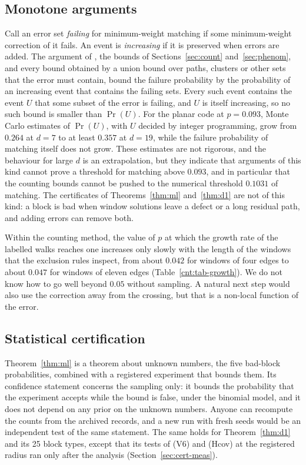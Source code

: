 \documentclass[11pt]{amsart}
\theoremstyle{definition}
\theoremstyle{remark}
\numberwithin{equation}{section}
\begin{document}
\subsection{Monotone arguments}\label{sec:disc-mono}
Call an error set \emph{failing} for minimum-weight matching if some minimum-weight correction of it fails. An event is \emph{increasing} if it is preserved when errors are added. The argument of \cite{DKLP02}, the bounds of Sections~\ref{sec:count} and~\ref{sec:phenom}, and every bound obtained by a union bound over paths, clusters or other sets that the error must contain, bound the failure probability by the probability of an increasing event that contains the failing sets. Every such event contains the event $U$ that some subset of the error is failing, and $U$ is itself increasing, so no such bound is smaller than $\Pr(U)$. For the planar code at $p=0.093$, Monte Carlo estimates of $\Pr(U)$, with $U$ decided by integer programming, grow from $0.264$ at $d=7$ to at least $0.357$ at $d=19$, while the failure probability of matching itself does not grow. These estimates are not rigorous, and the behaviour for large $d$ is an extrapolation, but they indicate that arguments of this kind cannot prove a threshold for matching above $0.093$, and in particular that the counting bounds cannot be pushed to the numerical threshold $0.1031$ of matching. The certificates of Theorems~\ref{thm:ml} and~\ref{thm:d1} are not of this kind: a block is bad when window solutions leave a defect or a long residual path, and adding errors can remove both.

Within the counting method, the value of $p$ at which the growth rate of the labelled walks reaches one increases only slowly with the length of the windows that the exclusion rules inspect, from about $0.042$ for windows of four edges to about $0.047$ for windows of eleven edges (Table~\ref{cnt:tab-growth}). We do not know how to go well beyond $0.05$ without sampling. A natural next step would also use the correction away from the crossing, but that is a non-local function of the error.

\subsection{Statistical certification}\label{sec:disc-stat}
Theorem~\ref{thm:ml} is a theorem about unknown numbers, the five bad-block probabilities, combined with a registered experiment that bounds them. Its confidence statement concerns the sampling only: it bounds the probability that the experiment accepts while the bound is false, under the binomial model, and it does not depend on any prior on the unknown numbers. Anyone can recompute the counts from the archived records, and a new run with fresh seeds would be an independent test of the same statement. The same holds for Theorem~\ref{thm:d1} and its 25 block types, except that its tests of (V6) and (Hcov) at the registered radius ran only after the analysis (Section~\ref{sec:cert-meas}).
\end{document}
